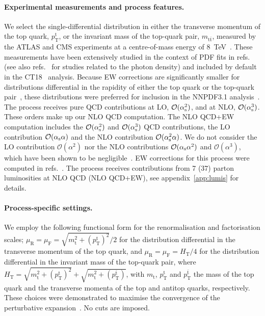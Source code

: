 \paragraph{Experimental measurements and process features.}
We select the single-differential distribution in either the transverse
momentum of the top quark, $p_\mathrm{T}^\mathrm{t}$, or the invariant mass of the top-quark
pair, $m_{\mathrm{t}\bar{\mathrm{t}}}$, measured by the ATLAS and CMS experiments at a centre-of-mass
energy of \SI{8}{\tera\electronvolt}~\cite{Aad:2015mbv,Khachatryan:2015oqa}. These measurements have
been extensively studied in the context of PDF fits in
refs.~\cite{Czakon:2016olj,Bailey:2019yze,Amoroso:2020lgh,Kadir:2020yml} (see
also refs.~\cite{Pagani:2016caq,Czakon:2017wor} for studies related to the photon density) and
included by default in the CT18~\cite{Hou:2019efy} analysis.
Because EW corrections are significantly smaller for distributions differential
in the rapidity of either the top quark or the top-quark
pair~\cite{Czakon:2017wor}, these distributions were preferred for inclusion
in the NNPDF3.1 analysis~\cite{Ball:2017nwa}. The process receives
pure QCD contributions at LO, $\mathcal{O}(\alpha_\mathrm{s}^2)$, and
at NLO, $\mathcal{O}(\alpha_\mathrm{s}^3)$. These orders make up our NLO QCD
computation. The NLO QCD+EW computation includes the $\mathcal{O}(\alpha_\mathrm{s}^2)$
and $\mathcal{O}(\alpha_\mathrm{s}^3)$ QCD contributions, the LO contribution
$\mathcal{O}(\alpha_\mathrm{s}\alpha)$ and the NLO contribution
$\mathcal{O}(\alpha_\mathrm{s}^2\alpha)$.
We do not consider the LO contribution $\mathcal{O}(\alpha^2)$ nor the
NLO contributions $\mathcal{O}(\alpha_\mathrm{s}\alpha^2)$ and $\mathcal{O}(\alpha^3)$, which have been shown to be negligible~\cite{Czakon:2017wor,Frederix:2018nkq}.
EW corrections for this process
were computed in refs.~\cite{Kuhn:2006vh,Bernreuther:2010ny,Hollik:2011ps,Kuhn:2011ri,Bernreuther:2012sx,Pagani:2016caq,Denner:2016jyo,Czakon:2017wor,Czakon:2017lgo,Czakon:2017mmr,Gutschow:2018tuk,Frederix:2018nkq,Czakon:2019bcq,Czakon:2019txp}. The process receives contributions from
7 (37) parton luminosities at NLO QCD (NLO QCD+EW),
see appendix~\ref{app:lumis} for details.

\paragraph{Process-specific settings.}
We employ the following functional form for the renormalisation and factorisation scales;
$\mu_\mathrm{R}=\mu_\mathrm{F}=\sqrt{m_\mathrm{t}^2+(p_\mathrm{T}^\mathrm{t})^2}{\Big /}2$ for the distribution differential
in the transverse momentum of the top quark, and $\mu_\mathrm{R}=\mu_\mathrm{F}=H_\mathrm{T}/4$ for the
distribution differential in the invariant mass of the top-quark pair, where
$H_\mathrm{T}=\sqrt{m_\mathrm{t}^2+(p_\mathrm{T}^\mathrm{t})^2}+\sqrt{m_\mathrm{t}^2+(p_\mathrm{T}^{\bar{\mathrm{t}}})}$, with $m_\mathrm{t}$,
$p_\mathrm{T}^\mathrm{t}$ and $p_\mathrm{T}^{\bar{\mathrm{t}}}$ the mass of the top quark and the transverse momenta
of the top and antitop quarks, respectively. These choices were demonstrated
to maximise the convergence of the perturbative expansion~\cite{Czakon:2016dgf}. No cuts are imposed.

